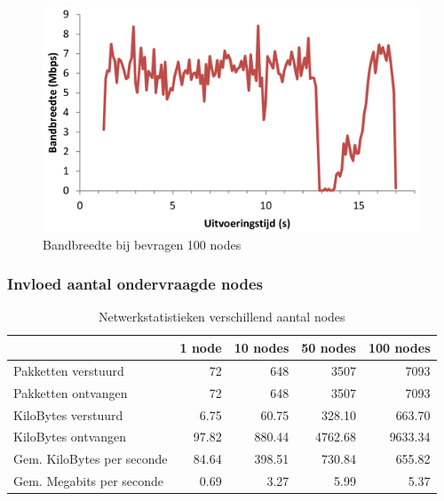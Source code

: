 \begin{figure}[h]
	\centering
	\includegraphics[scale=0.40]{figures/bandbreedte/bandbreedte-100nodes}
	\caption{Bandbreedte bij bevragen 100 nodes}
	\label{fig-bandbreedte-100-nodes}
\end{figure}


\subsubsection{Invloed aantal ondervraagde nodes}


\begin{table}[h]
\centering
\begin{tabular}{@{}lrrrr@{}}
\toprule
                           & 1 node & 10 nodes & 50 nodes & 100 nodes \\ \midrule
Pakketten verstuurd        & 72     & 648      & 3507     & 7093      \\
Pakketten ontvangen        & 72     & 648      & 3507     & 7093      \\
KiloBytes verstuurd        & 6.75   & 60.75    & 328.10   & 663.70    \\
KiloBytes ontvangen        & 97.82  & 880.44   & 4762.68  & 9633.34   \\
Gem. KiloBytes per seconde & 84.64  & 398.51   & 730.84   & 655.82    \\
Gem. Megabits per seconde  & 0.69   & 3.27     & 5.99     & 5.37      \\ \bottomrule
\end{tabular}
\caption{Netwerkstatistieken verschillend aantal nodes}
\label{tabel-bandbreedte-aantalnodes}
\end{table}

